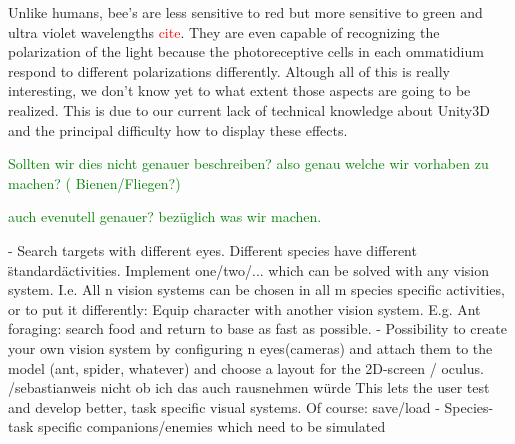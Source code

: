 \documentclass{acm_proc_article-sp}
\newcommand{\todo}[1]{\textcolor{Red}{#1}}
\newcommand{\sebastian}[1]{\textcolor{Green}{#1}}
\begin{document}
Unlike humans, bee's are less sensitive to red but more sensitive to green and
ultra violet wavelengths \todo{cite}. They are even capable of recognizing the
polarization of the light because the photoreceptive cells in each ommatidium
respond to different polarizations differently.
Altough all of this is really interesting, we don't know yet to what extent those
aspects are going to be realized. This is due to our current lack of technical
knowledge about Unity3D and the principal difficulty how to display these
effects.

\begin{description}
\sebastian{Sollten wir dies nicht genauer beschreiben? also genau welche wir vorhaben zu machen? ( Bienen/Fliegen?)}

\sebastian{auch evenutell genauer? bezüglich was wir machen.}


\item[Gamification]
- Search targets with different eyes. Different species have different
  \"standard\" activities.
  Implement one/two/... which can be solved with any vision system.
  I.e. All n vision systems can be chosen in all m species specific activities,
  or to put it differently: Equip character with another vision system.
  E.g. Ant foraging: search food and return to base as fast as possible.
- Possibility to create your own vision system by configuring n eyes(cameras)
  and attach them to the model (ant, spider, whatever) and choose a layout
  for the 2D-screen / oculus.
  /sebastian{weis nicht ob ich das auch rausnehmen würde}
  This lets the user test and develop better, task specific visual systems.
  Of course: save/load
- Species-task specific companions/enemies which need to be simulated


\end{description}
\end{document}
